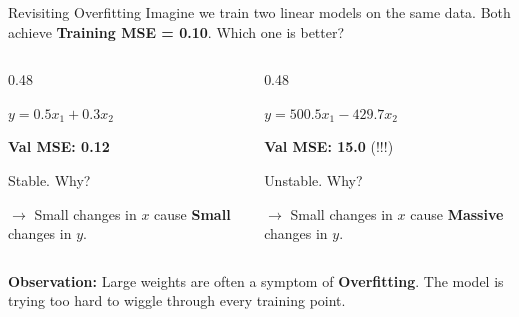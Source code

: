 \begin{frame}{Revisiting Overfitting}
    Imagine we train two linear models on the same data. Both achieve \textbf{Training MSE = 0.10}.
    Which one is better?
    
    \vspace{1em}
    \begin{columns}[c]
    \begin{column}{0.48\textwidth}
        \begin{tcolorbox}[colback=green!5, title=Model A (Small Weights)]
            $y = 0.5 x_1 + 0.3 x_2$
            \vspace{0.5em}
            
            \textbf{Val MSE: 0.12}
            \vspace{0.5em}
            
            Stable. Why? 
            
            $\rightarrow$ Small changes in $x$ cause \textbf{Small} changes in $y$.
        \end{tcolorbox}
    \end{column}
    
    \begin{column}{0.48\textwidth}
        \begin{tcolorbox}[colback=red!5, title=Model B (Huge Weights)]
            $y = 500.5 x_1 - 429.7 x_2$
            \vspace{0.5em}
            
            \textbf{Val MSE: 15.0} (!!!)
            \vspace{0.5em}
            
            Unstable. Why? 
            
            $\rightarrow$ Small changes in $x$ cause \textbf{Massive} changes in $y$.
        \end{tcolorbox}
    \end{column}
\end{columns}
\pause
\textbf{Observation:} Large weights are often a symptom of \textbf{Overfitting}. The model is trying too hard to wiggle through every training point.
\end{frame}


